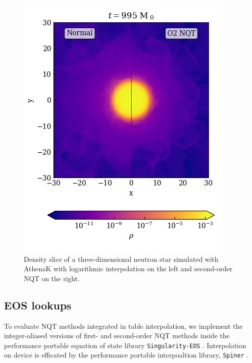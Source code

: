 \documentclass[linenumbers,twocolumn]{aastex631}
\begin{document}
\begin{nolinenumbers}
\begin{figure}[tb]
    \centering
    \includegraphics[width=0.9\columnwidth]{figures/athenaknsvolume.png}
    \caption{Density slice of a three-dimensional neutron star simulated with AthenaK with logarithmic interpolation on the left and second-order NQT on the right.}
    \label{fig:TOV:rho}
\end{figure}
\end{nolinenumbers}

\subsection{EOS lookups}
\label{sec:lookups}

To evaluate NQT methods integrated in table interpolation, we implement the integer-aliased versions of first- and second-order NQT methods inside the performance portable equation of state library {\tt Singularity-EOS} \citep{singularityeos}. Interpolation on device is efficated by the performance portable interpoaltion library, {\tt Spiner} \citep{Spiner}.
\end{document}
